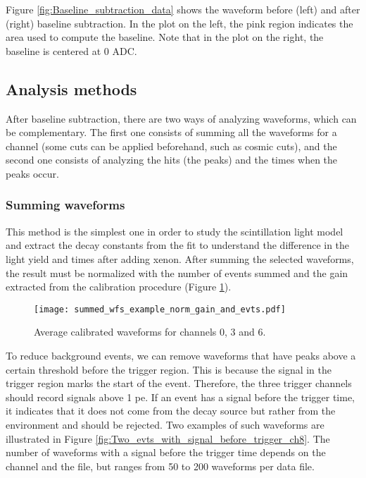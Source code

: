 \documentclass[11pt,a4paper,english,oneside, pdf]{article}
\begin{document}
	Figure \ref{fig:Baseline_subtraction_data} shows the waveform before (left) and after (right) baseline subtraction. In the plot on the left, the pink region indicates the area used to compute the baseline. Note that in the plot on the right, the baseline is centered at 0 ADC.
	
	
	\vspace{20pt}
	
	\subsection{Analysis methods}
	
	After baseline subtraction, there are two ways of analyzing waveforms, which can be complementary. The first one consists of summing all the waveforms for a channel (some cuts can be applied beforehand, such as cosmic cuts), and the second one consists of analyzing the hits (the peaks) and the times when the peaks occur.
	
	
	\subsubsection{Summing waveforms}
	
	This method is the simplest one in order to study the scintillation light model and extract the decay constants from the fit to understand the difference in the light yield and times after adding xenon. After summing the selected waveforms, the result must be normalized with the number of events summed and the gain extracted from the calibration procedure (Figure \ref{fig:summed_wfs_example}).
	
	\begin{figure}[!h]
		\begin{center}
			\texttt{[image: summed\_wfs\_example\_norm\_gain\_and\_evts.pdf]}
			\caption{Average calibrated waveforms for channels 0, 3 and 6.}
			\label{fig:summed_wfs_example}
		\end{center}
	\end{figure}
	
	
	To reduce background events, we can remove waveforms that have peaks above a certain threshold before the trigger region. This is because the signal in the trigger region marks the start of the event. Therefore, the three trigger channels should record signals above 1 pe. If an event has a signal before the trigger time, it indicates that it does not come from the decay source but rather from the environment and should be rejected. Two examples of such waveforms are illustrated in Figure \ref{fig:Two_evts_with_signal_before_trigger_ch8}. The number of waveforms with a signal before the trigger time depends on the channel and the file, but ranges from 50 to 200 waveforms per data file.
	
\end{document}
